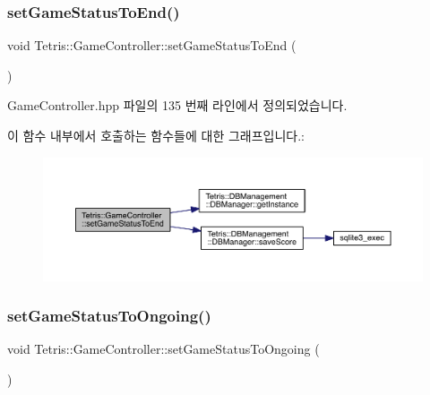 \subsubsection{\texorpdfstring{set\+Game\+Status\+To\+End()}{setGameStatusToEnd()}\hspace{0.1cm}{\footnotesize\ttfamily [2/2]}}
{\footnotesize\ttfamily void Tetris\+::\+Game\+Controller\+::set\+Game\+Status\+To\+End (\begin{DoxyParamCaption}{ }\end{DoxyParamCaption})\hspace{0.3cm}{\ttfamily [inline]}}



Game\+Controller.\+hpp 파일의 135 번째 라인에서 정의되었습니다.

이 함수 내부에서 호출하는 함수들에 대한 그래프입니다.\+:
\nopagebreak
\begin{figure}[H]
\begin{center}
\leavevmode
\includegraphics[width=350pt]{class_tetris_1_1_game_controller_a3c5e6034b2e2faf70371a13eb5f9c5bb_cgraph}
\end{center}
\end{figure}
\mbox{\label{class_tetris_1_1_game_controller_a47681985e6fbf14411a70be08f85bf99}} 
\subsubsection{\texorpdfstring{set\+Game\+Status\+To\+Ongoing()}{setGameStatusToOngoing()}\hspace{0.1cm}{\footnotesize\ttfamily [1/2]}}
{\footnotesize\ttfamily void Tetris\+::\+Game\+Controller\+::set\+Game\+Status\+To\+Ongoing (\begin{DoxyParamCaption}{ }\end{DoxyParamCaption})}



